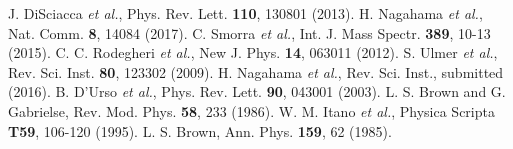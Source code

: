 \documentclass[12pt,preprint%
]{elsarticle}
\begin{document}
\begin{thebibliography}{}
 J. DiSciacca \textit{et al.}, Phys. Rev. Lett. \textbf{110}, 130801 (2013).
 H. Nagahama \textit{et al.}, Nat. Comm. \textbf{8}, 14084 (2017).
 C. Smorra \emph{et al.}, Int. J. Mass Spectr. \textbf{389}, 10-13 (2015).
 C. C. Rodegheri \textit{et al.}, New J. Phys. \textbf{14}, 063011 (2012).
 S. Ulmer \emph{et al.}, Rev. Sci. Inst. \textbf{80}, 123302 (2009).
 H. Nagahama \emph{et al.}, Rev. Sci. Inst., submitted (2016).
 B. D'Urso \textit{et al.}, Phys. Rev. Lett. \textbf{90}, 043001 (2003).
 L. S. Brown and G. Gabrielse, Rev. Mod. Phys. \textbf{58}, 233 (1986).
 W. M. Itano \emph{et al.}, Physica Scripta \textbf{T59}, 106-120 (1995).
 L. S. Brown, Ann. Phys. \textbf{159}, 62 (1985).





\end{thebibliography}
\end{document}
